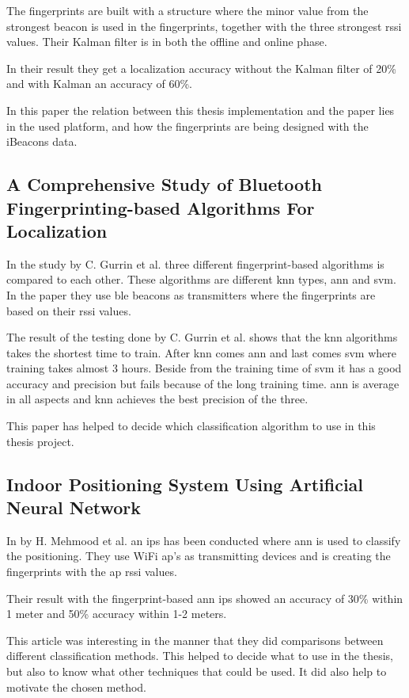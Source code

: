 \bigskip

The fingerprints are built with a structure where the minor value from the strongest beacon is used in the fingerprints, together with the three strongest \acrshort{rssi} values.
Their Kalman filter is in both the offline and online phase.

\bigskip

In their result they get a localization accuracy without the Kalman filter of 20\% and with Kalman an accuracy of 60\%.

\bigskip

In this paper the relation between this thesis implementation and the paper lies in the used platform, and how the fingerprints are being designed with the iBeacons data.


\subsection{A Comprehensive Study of Bluetooth Fingerprinting-based Algorithms For 
Localization}
In the study \cite{ComprehensiveStudyBluetooth2013} by C. Gurrin et al. three different fingerprint-based algorithms is compared to each other.
These algorithms are different \acrshort{knn} types, \acrfull{ann} and \acrfull{svm}.
In the paper they use \acrshort{ble} beacons as transmitters where the fingerprints are based on their \acrshort{rssi} values.

\bigskip

The result of the testing done by C. Gurrin et al. shows that the \acrshort{knn} algorithms takes the shortest time to train.
After \acrshort{knn} comes \acrshort{ann} and last comes \acrshort{svm} where training takes almost 3 hours.
Beside from the training time of \acrshort{svm}  it has a good accuracy and precision but fails because of the long training time.  \acrshort{ann} is average in all aspects and \acrshort{knn} achieves the best precision of the three.

\bigskip

This paper has helped to decide which classification algorithm to use in this thesis project.

\subsection{Indoor Positioning System Using Artificial Neural Network}
In \cite{IndoorPositioningSystem2010} by H. Mehmood et al. an \acrshort{ips} has been conducted where \acrshort{ann} is used to classify the positioning.
They use WiFi \acrshort{ap}'s as transmitting devices and is creating the fingerprints with the \acrshort{ap} \acrshort{rssi} values.

\bigskip

Their result with the fingerprint-based \acrshort{ann} \acrshort{ips} showed an accuracy of 30\% within 1 meter and 50\% accuracy within 1-2 meters.

\bigskip

This article was interesting in the manner that they did comparisons between different classification methods.
This helped to decide what to use in the thesis, but also to know what other techniques that could be used.
It did also help to motivate the chosen method.
